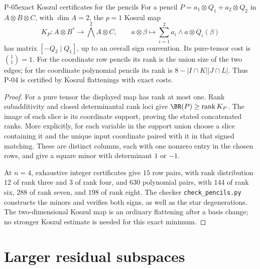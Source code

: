 \begin{finding}{P-05}{exact Koszul certificates for the pencils}
For a pencil \(P=a_1\otimes Q_1+a_2\otimes Q_2\) in
\(A\otimes B\otimes C\), with \(\dim A=2\), the \(p=1\)
Koszul map
\[
 K_P:A\otimes B^*\longrightarrow\bigwedge^2A\otimes C,
 \qquad
 a\otimes\beta\longmapsto
 \sum_{i=1}^2a_i\wedge a\otimes Q_i(\beta)
\]
has matrix \([-Q_2\mid Q_1]\), up to an overall sign convention.
Its pure-tensor cost is \(\binom11=1\).
For the coordinate row pencils its rank is the union size of
the two edges; for the coordinate polynomial pencils its rank
is \(8-|I\cap K||J\cap L|\). Thus P-04 is certified by
Koszul flattenings with exact costs.
\end{finding}
\begin{proof}
For a pure tensor the displayed map has rank at most one.
Rank subadditivity and closed determinantal rank loci give
\(\BR(P)\geq\operatorname{rank}K_P\).
The image of each slice is its coordinate support, proving
the stated concatenated ranks. More explicitly, for each
variable in the support union choose a slice containing it
and the unique input coordinate paired with it in that
signed matching. These are distinct columns, each with one
nonzero entry in the chosen rows, and give a square minor
with determinant \(1\) or \(-1\).

At \(n=4\), exhaustive integer certificates give \(15\) row
pairs, with rank distribution \(12\) of rank three and \(3\)
of rank four, and \(630\) polynomial pairs, with \(144\) of
rank six, \(288\) of rank seven, and \(198\) of rank eight.
The checker \texttt{check\_pencils.py} constructs the minors
and verifies both signs, as well as the star degenerations.
The two-dimensional Koszul map is an ordinary flattening
after a basis change; no stronger Koszul estimate is needed
for this exact minimum.
\end{proof}

\section{Larger residual subspaces}

